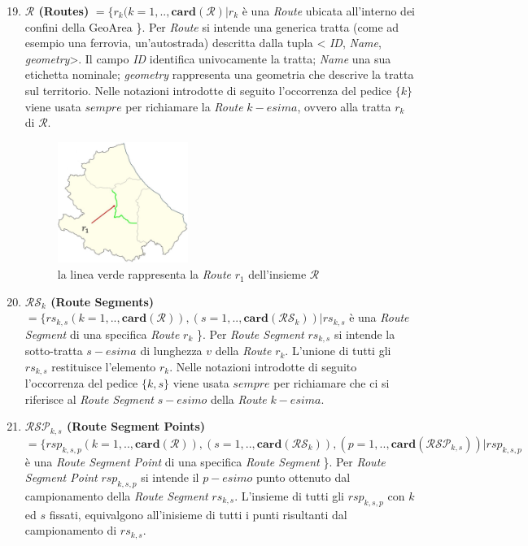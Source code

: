 \begin{enumerate}
	\setcounter{enumi}{18}
	\item \textbf{$ \mathcal{R} $ (Routes)} $ = \{r_k(k=1,..,\mathbf{card}(\mathcal{R}) | r_k $ è una \textit{Route} ubicata all'interno dei confini della  GeoArea \}. Per \textit{Route} si intende una generica tratta (come ad esempio una ferrovia, un'autostrada) descritta dalla tupla < \textit{ID}, \textit{Name}, \textit{geometry}>. Il campo \textit{ID} identifica univocamente la tratta; \textit{Name} una sua etichetta nominale; \textit{geometry} rappresenta una geometria che descrive la tratta sul territorio. Nelle notazioni introdotte di seguito l'occorrenza del pedice $\{k\}$ viene usata $sempre$ per richiamare la \textit{Route} $k-esima$, ovvero alla tratta $r_k$ di $ \mathcal{R} $.
	
		\begin{figure}[h]
		\centering
		\includegraphics[width=0.4\textwidth]{images/routes1}
		\caption{la linea verde rappresenta la \textit{Route} $r_1$ dell'insieme $ \mathcal{R} $}
		\label{img:route}
		\end{figure}
	
	\item \textbf{$ \mathcal{RS}_k $ (Route Segments)} $ = \{rs_{k,s}(k=1,..,\mathbf{card}(\mathcal{R})),(s=1,..,\mathbf{card}(\mathcal{RS}_k))  | rs_{k,s} $ è una \textit{Route Segment} di una specifica \textit{Route} $r_k$ \}. Per \textit{Route Segment} $rs_{k,s}$ si intende la sotto-tratta $s-esima$ di lunghezza $v$ della \textit{Route} $r_k$. L'unione di tutti gli $rs_{k,s}$ restituisce l'elemento $r_k$. Nelle notazioni introdotte di seguito l'occorrenza del pedice $\{k,s\}$ viene usata $sempre$ per richiamare che ci si riferisce al \textit{Route Segment} $s-esimo$ della \textit{Route} $k-esima$.
		
	\item \textbf{$ \mathcal{RSP}_{k,s} $ (Route Segment Points)} $ = \{rsp_{k,s,p}(k=1,..,\mathbf{card}(\mathcal{R})),(s=1,..,\mathbf{card}(\mathcal{RS}_k)),(p=1,..,\mathbf{card}(\mathcal{RSP}_{k,s}))  | rsp_{k,s,p} $ è una \textit{Route Segment Point} di una specifica \textit{Route Segment} \}. Per \textit{Route Segment Point} $rsp_{k,s,p}$ si intende il $p-esimo$ punto ottenuto dal campionamento della \textit{Route Segment} $rs_{k,s}$. L'insieme di tutti gli $rsp_{k,s,p}$ con $k$ ed $s$ fissati, equivalgono all'inisieme di tutti i punti risultanti dal campionamento di $rs_{k,s}$.
	
\end{enumerate}

